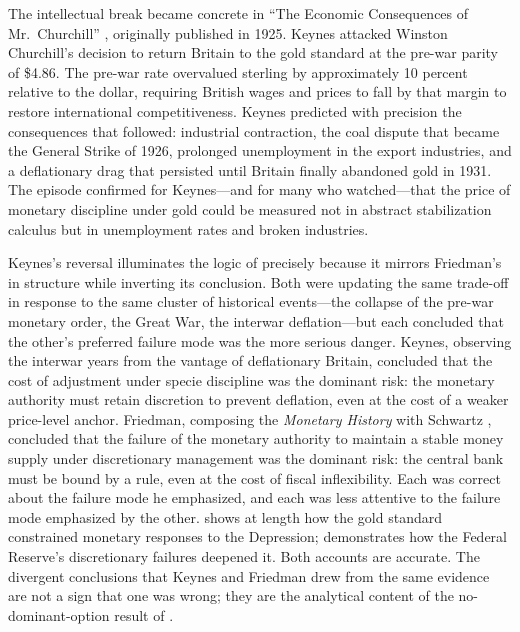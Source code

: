 \documentclass[12pt]{article}
\begin{document}
The intellectual break became concrete in ``The Economic Consequences of
Mr.~Churchill'' \citep{Keynes1931}, originally published in 1925.
Keynes attacked Winston Churchill's decision to return Britain to the
gold standard at the pre-war parity of \$4.86.  The pre-war rate
overvalued sterling by approximately 10 percent relative to the dollar,
requiring British wages and prices to fall by that margin to restore
international competitiveness.  Keynes predicted with precision the
consequences that followed: industrial contraction, the coal dispute that
became the General Strike of 1926, prolonged unemployment in the export
industries, and a deflationary drag that persisted until Britain finally
abandoned gold in 1931.  The episode confirmed for Keynes---and for many
who watched---that the price of monetary discipline under gold could be
measured not in abstract stabilization calculus but in unemployment
rates and broken industries.

Keynes's reversal illuminates the logic of \citet{Sargent2011} precisely
because it mirrors Friedman's in structure while inverting its conclusion.
Both were updating the same trade-off in response to the same cluster of
historical events---the collapse of the pre-war monetary order, the Great
War, the interwar deflation---but each concluded that the other's
preferred failure mode was the more serious danger.  Keynes, observing the
interwar years from the vantage of deflationary Britain, concluded that
the cost of adjustment under specie discipline was the dominant risk:
the monetary authority must retain discretion to prevent deflation, even
at the cost of a weaker price-level anchor.  Friedman, composing the
\textit{Monetary History} with Schwartz \citep{FriedmanSchwartz1963},
concluded that the failure of the monetary authority to maintain a stable
money supply under discretionary management was the dominant risk: the
central bank must be bound by a rule, even at the cost of fiscal
inflexibility.  Each was correct about the failure mode he emphasized, and
each was less attentive to the failure mode emphasized by the other.
\citet{Eichengreen1992} shows at length how the gold standard constrained
monetary responses to the Depression; \citet{FriedmanSchwartz1963}
demonstrates how the Federal Reserve's discretionary failures deepened it.
Both accounts are accurate.  The divergent conclusions that Keynes and
Friedman drew from the same evidence are not a sign that one was wrong;
they are the analytical content of the no-dominant-option result of
\citet{Sargent2011}.
\end{document}
